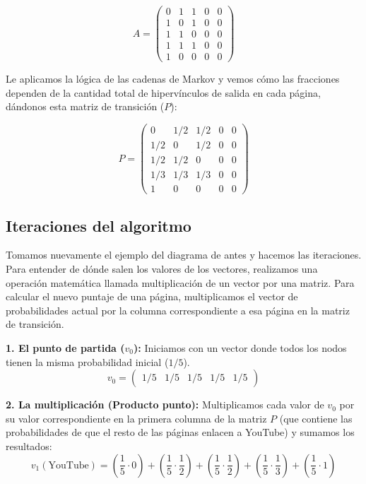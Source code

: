 \documentclass[12pt,letterpaper]{article}
\begin{document}
\begin{equation}
    A = \begin{pmatrix}
    0 & 1 & 1 & 0 & 0 \\
    1 & 0 & 1 & 0 & 0 \\
    1 & 1 & 0 & 0 & 0 \\
    1 & 1 & 1 & 0 & 0 \\
    1 & 0 & 0 & 0 & 0
    \end{pmatrix}
\end{equation}

Le aplicamos la lógica de las cadenas de Markov y vemos cómo las fracciones dependen de la cantidad total de hipervínculos de salida en cada página, dándonos esta matriz de transición ($P$):

\begin{equation}
    P = \begin{pmatrix}
    0 & 1/2 & 1/2 & 0 & 0 \\
    1/2 & 0 & 1/2 & 0 & 0 \\
    1/2 & 1/2 & 0 & 0 & 0 \\
    1/3 & 1/3 & 1/3 & 0 & 0 \\
    1 & 0 & 0 & 0 & 0
    \end{pmatrix}
\end{equation}

\subsection{Iteraciones del algoritmo}
Tomamos nuevamente el ejemplo del diagrama de antes y hacemos las iteraciones. Para entender de dónde salen los valores de los vectores, realizamos una operación matemática llamada multiplicación de un vector por una matriz. Para calcular el nuevo puntaje de una página, multiplicamos el vector de probabilidades actual por la columna correspondiente a esa página en la matriz de transición.

\textbf{1. El punto de partida ($v_0$):}
Iniciamos con un vector donde todos los nodos tienen la misma probabilidad inicial ($1/5$).
\begin{equation}
    v_0 = \begin{pmatrix} 1/5 & 1/5 & 1/5 & 1/5 & 1/5 \end{pmatrix}
\end{equation}

\textbf{2. La multiplicación (Producto punto):}
Multiplicamos cada valor de $v_0$ por su valor correspondiente en la primera columna de la matriz $P$ (que contiene las probabilidades de que el resto de las páginas enlacen a YouTube) y sumamos los resultados:
\begin{equation}
    v_1(\text{YouTube}) = \left(\frac{1}{5} \cdot 0\right) + \left(\frac{1}{5} \cdot \frac{1}{2}\right) + \left(\frac{1}{5} \cdot \frac{1}{2}\right) + \left(\frac{1}{5} \cdot \frac{1}{3}\right) + \left(\frac{1}{5} \cdot 1\right)
\end{equation}
\end{document}
